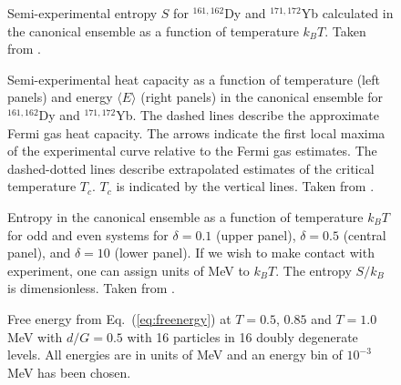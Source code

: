 \documentclass[preprint,rmp,aps,floatfix]{revtex4}
\begin{document}
\begin{figure}
\caption{Semi-experimental entropy 
$S$ for $^{161,162}$Dy and $^{171,172}$Yb calculated in 
the canonical ensemble as a 
function of temperature $k_BT$. Taken from \cite{entropy2000}.}
\label{fig:fig10_sec3}
\end{figure}

\begin{figure}\centering
\caption{Semi-experimental heat capacity as a function of temperature (left 
panels) and energy $\langle E\rangle$ (right panels) in the canonical ensemble 
for $^{161,162}$Dy and $^{171,172}$Yb. The dashed lines describe the 
approximate Fermi gas heat capacity. The arrows indicate the first local 
maxima of the experimental curve relative to the Fermi gas estimates. The 
dashed-dotted lines describe extrapolated estimates of 
the critical temperature $T_c$. $T_c$ is indicated
by the vertical lines. 
Taken from \cite{schiller2001}.}
\label{fig:heatcapacity} 
\end{figure}

\begin{figure}
\caption{Entropy in the canonical ensemble as a function 
of temperature $k_BT$ for odd and even systems for $\delta=0.1$ 
(upper panel), $\delta=0.5$ (central panel),
and $\delta=10$ (lower panel).
If we wish to make contact with experiment, one can assign units 
of MeV to $k_BT$.  The entropy $S/k_B$ is dimensionless. Taken from \cite{entropy2000}.
} 
\label{fig:fig5_sec3}
\end{figure}

\begin{figure}
\caption{Free energy from Eq.~(\ref{eq:freenergy}) at $T=0.5$, $0.85$ and
         $T=1.0$ MeV  with 
         $d/G=0.5$ with 16 particles in 16 doubly degenerate
         levels. All energies are in units of MeV and 
         an energy bin of $10^{-3}$ MeV has been chosen.}
\label{fig:free_energy16}
\end{figure}
\end{document}
